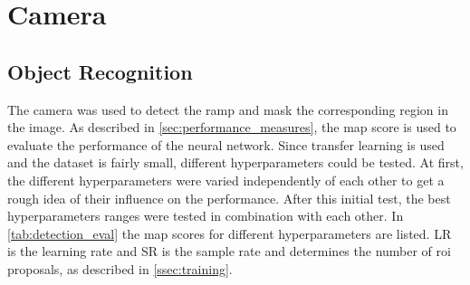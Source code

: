 \section{Camera}
\label{sec:eval_camera}
\subsection{Object Recognition}
The camera was used to detect the ramp and mask the corresponding region in the image.
As described in \cref{sec:performance_measures}, the \gls{map} score is used to evaluate the performance of the neural network.
Since transfer learning is used and the dataset is fairly small, different hyperparameters could be tested.
At first, the different hyperparameters were varied independently of each other to get a rough idea of their influence on the performance.
After this initial test, the best hyperparameters ranges were tested in combination with each other.
In \cref{tab:detection_eval} the \gls{map} scores for different hyperparameters are listed.
LR is the learning rate and SR is the sample rate and determines the number of \gls{roi} proposals, as described in \cref{ssec:training}.\par
{}

